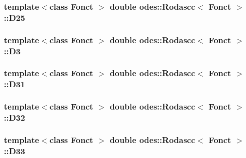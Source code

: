 \hypertarget{classodes_1_1Rodascc_aa27fbb4213d174cf92476dcf2a5650a5}{
\subsubsection[{D25}]{\setlength{\rightskip}{0pt plus 5cm}template$<$class Fonct $>$ double {\bf odes\-::\-Rodascc}$<$ Fonct $>$\-::D25\hspace{0.3cm}{\ttfamily [private]}}}\label{classodes_1_1Rodascc_aa27fbb4213d174cf92476dcf2a5650a5}
\hypertarget{classodes_1_1Rodascc_abf38d580df641b6be9b52f3a1909cdee}{
\subsubsection[{D3}]{\setlength{\rightskip}{0pt plus 5cm}template$<$class Fonct $>$ double {\bf odes\-::\-Rodascc}$<$ Fonct $>$\-::D3\hspace{0.3cm}{\ttfamily [private]}}}\label{classodes_1_1Rodascc_abf38d580df641b6be9b52f3a1909cdee}
\hypertarget{classodes_1_1Rodascc_aef5ec4f4e56838240bb27b0dd885a902}{
\subsubsection[{D31}]{\setlength{\rightskip}{0pt plus 5cm}template$<$class Fonct $>$ double {\bf odes\-::\-Rodascc}$<$ Fonct $>$\-::D31\hspace{0.3cm}{\ttfamily [private]}}}\label{classodes_1_1Rodascc_aef5ec4f4e56838240bb27b0dd885a902}
\hypertarget{classodes_1_1Rodascc_a8c0b7076be1e682664934ac75e54a233}{
\subsubsection[{D32}]{\setlength{\rightskip}{0pt plus 5cm}template$<$class Fonct $>$ double {\bf odes\-::\-Rodascc}$<$ Fonct $>$\-::D32\hspace{0.3cm}{\ttfamily [private]}}}\label{classodes_1_1Rodascc_a8c0b7076be1e682664934ac75e54a233}
\hypertarget{classodes_1_1Rodascc_afef2ffd33914d6fff0c5a274c148ab1f}{
\subsubsection[{D33}]{\setlength{\rightskip}{0pt plus 5cm}template$<$class Fonct $>$ double {\bf odes\-::\-Rodascc}$<$ Fonct $>$\-::D33\hspace{0.3cm}{\ttfamily [private]}}}\label{classodes_1_1Rodascc_afef2ffd33914d6fff0c5a274c148ab1f}

